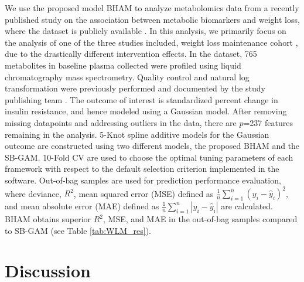 \documentclass[AMA,STIX1COL,]{WileyNJD-v2}
\begin{document}
We use the proposed model BHAM to analyze metabolomics data from a
recently published study \citep{Bihlmeyer2021} on the association
between metabolic biomarkers and weight loss, where the dataset is
publicly available \citep{Bihlmeyer2021_data}. In this analysis, we
primarily focus on the analysis of one of the three studies included,
weight loss maintenance cohort \citep{Svetkey2008}, due to the
drastically different intervention effects. In the dataset, 765
metabolites in baseline plasma collected were profiled using liquid
chromatography mass spectrometry. Quality control and natural log
transformation were previously performed and documented by the study
publishing team \cite{Bihlmeyer2021}. The outcome of interest is
standardized percent change in insulin resistance, and hence modeled
using a Gaussian model. After removing missing datapoints and addressing
outliers in the data, there are \(p\)=237 features remaining in the
analysis. 5-Knot spline additive models for the Gaussian outcome are
constructed using two different models, the proposed BHAM and the
SB-GAM. 10-Fold CV are used to choose the optimal tuning parameters of
each framework with respect to the default selection criterion
implemented in the software. Out-of-bag samples are used for prediction
performance evaluation, where deviance, \(R^2\), mean squared error
(MSE) defined as \(\frac{1}{n}\sum\limits^{n}_{i=1}(y_i - \hat y_i)^2\),
and mean absolute error (MAE) defined as
\(\frac{1}{n}\sum\limits^{n}_{i=1}|y_i - \hat y_i|\) are calculated.
BHAM obtains superior \(R^2\), MSE, and MAE in the out-of-bag samples
compared to SB-GAM (see Table \ref{tab:WLM_res}).

\section{Discussion}
\label{sec:concl}
\end{document}
